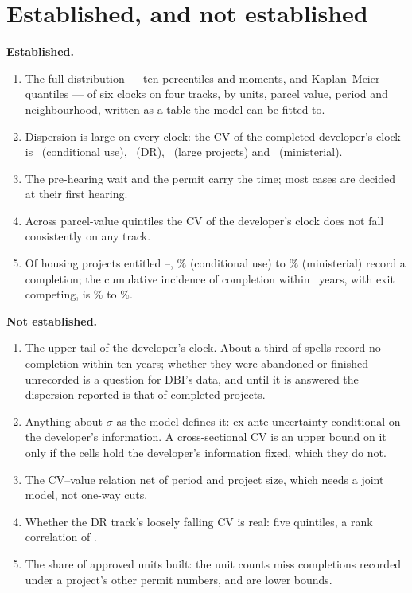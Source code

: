 \documentclass[11pt]{article}
\begin{document}
\section{Established, and not established}

\textbf{Established.}
\begin{enumerate}
\item The full distribution --- ten percentiles and moments, and Kaplan--Meier quantiles --- of six
clocks on four tracks, by units, parcel value, period and neighbourhood, written as a table the
model can be fitted to.
\item Dispersion is large on every clock: the CV of the completed developer's clock is
\ckTotCvCu\ (conditional use), \ckTotCvDr\ (DR), \ckTotCvLpa\ (large projects) and \ckTotCvMin\
(ministerial).
\item The pre-hearing wait and the permit carry the time; most cases are decided at their first
hearing.
\item Across parcel-value quintiles the CV of the developer's clock does not fall consistently
on any track.
\item Of housing projects entitled \ocMatureFrom--\ocMatureTo, \ocDoneCu\% (conditional use) to
\ocDoneMin\% (ministerial) record a completion; the cumulative incidence of completion within
\ocYears\ years, with exit competing, is \ocCifCu\% to \ocCifMin\%.
\end{enumerate}

\textbf{Not established.}
\begin{enumerate}
\item The upper tail of the developer's clock. About a third of spells record no completion
within ten years; whether they were abandoned or finished unrecorded is a question for DBI's
data, and until it is answered the dispersion reported is that of completed projects.
\item Anything about $\sigma$ as the model defines it: ex-ante uncertainty conditional on the
developer's information. A cross-sectional CV is an upper bound on it only if the cells hold the
developer's information fixed, which they do not.
\item The CV--value relation net of period and project size, which needs a joint model, not
one-way cuts.
\item Whether the DR track's loosely falling CV is real: five quintiles, a rank correlation of
\ckCvRhoDr.
\item The share of approved units built: the unit counts miss completions recorded under a
project's other permit numbers, and are lower bounds.
\end{enumerate}
\end{document}
